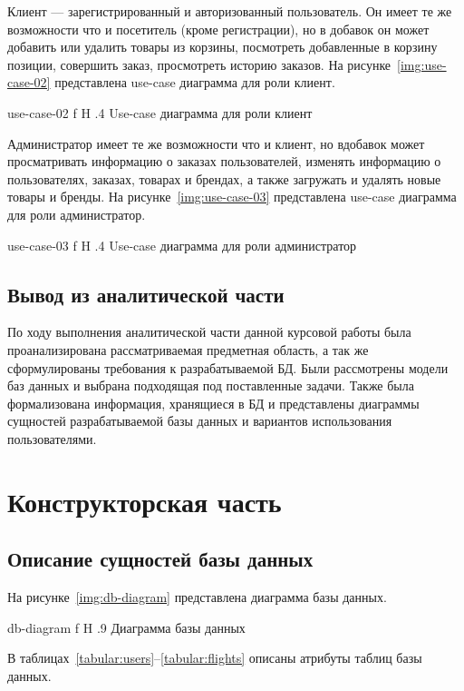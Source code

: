 \documentclass{bmstu}
\begin{document}
Клиент --- зарегистрированный и авторизованный пользователь. 
Он имеет те же возможности что и посетитель (кроме регистрации), но в добавок он может добавить или удалить товары из корзины, посмотреть добавленные в корзину позиции, совершить заказ, просмотреть историю заказов. На рисунке~\ref{img:use-case-02} представлена use-case диаграмма для роли клиент.

{use-case-02}
{f}
{H}
{.4\textwidth}
{Use-case диаграмма для роли клиент}

Администратор имеет те же возможности что и клиент, но вдобавок может просматривать информацию о заказах пользователей, изменять информацию о пользователях, заказах, товарах и брендах, а также загружать и удалять новые товары и бренды. На рисунке~\ref{img:use-case-03} представлена use-case диаграмма для роли администратор.

{use-case-03}
{f}
{H}
{.4\textwidth}
{Use-case диаграмма для роли администратор}

\section*{Вывод из аналитической части}

По ходу выполнения аналитической части данной курсовой работы была проанализирована рассматриваемая предметная область, а так же сформулированы требования к разрабатываемой БД. Были рассмотрены модели баз данных и выбрана подходящая под поставленные задачи. Также была формализована информация, хранящиеся в БД и представлены диаграммы сущностей разрабатываемой базы данных и вариантов использования пользователями.

\chapter{Конструкторская часть}

\section{Описание сущностей базы данных}

На рисунке~\ref{img:db-diagram} представлена диаграмма базы данных.

    {db-diagram}
    {f}
    {H}
    {.9\textwidth}
    {Диаграмма базы данных}

В таблицах~\ref{tabular:users}--\ref{tabular:flights} описаны атрибуты таблиц базы данных.
\end{document}
